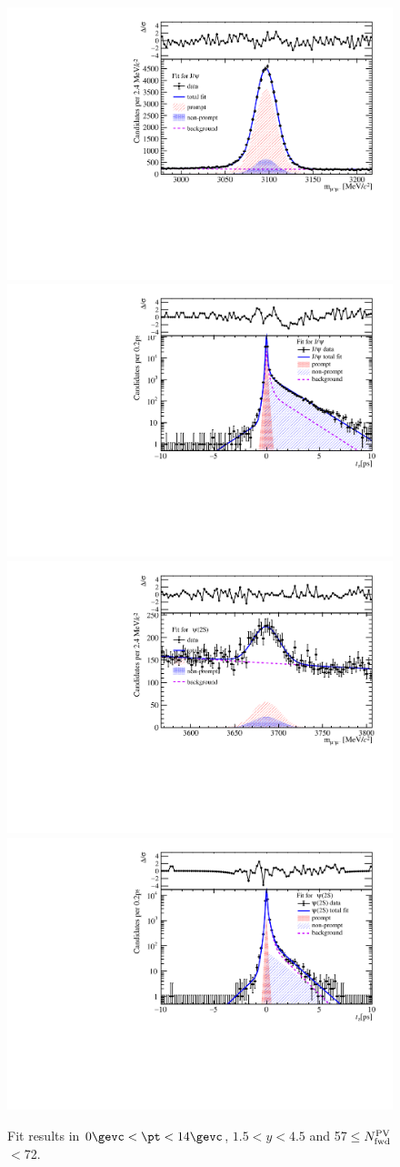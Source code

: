 \begin{figure}[H]
\begin{center}
\includegraphics[width=0.45\linewidth]{pdf/pPb/FWorkdir/TwoDimFit/ProjMass/Jpsi_n4y1pt1.pdf}
\includegraphics[width=0.45\linewidth]{pdf/pPb/FWorkdir/TwoDimFit/ProjTz/Jpsi_n4y1pt1.pdf}
\vspace*{-0.5cm}
\includegraphics[width=0.45\linewidth]{pdf/pPb/FWorkdir/TwoDimFit/ProjMass/Psi2S_n4y1pt1.pdf}
\includegraphics[width=0.45\linewidth]{pdf/pPb/FWorkdir/TwoDimFit/ProjTz/Psi2S_n4y1pt1.pdf}
\vspace*{-0.5cm}
\end{center}
\caption{Fit results in $0\gevc<\pt<14\gevc$, $1.5<y<4.5$ and 57$\leq$$N^{\rm PV}_{\rm fwd}$$<$72.}
\end{figure}
